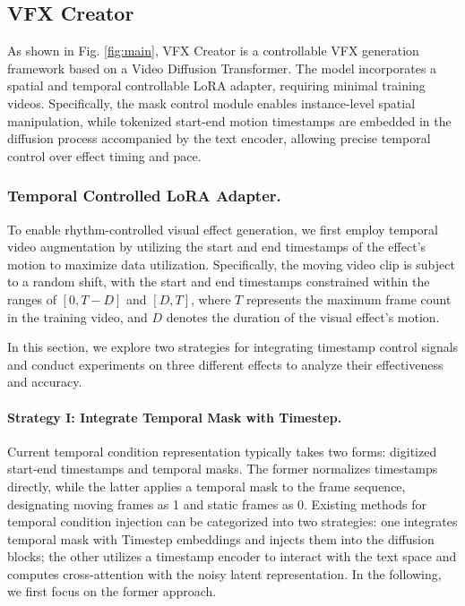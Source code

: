 \subsection{VFX Creator}
As shown in Fig. \ref{fig:main}, VFX Creator is a controllable VFX generation framework based on a Video Diffusion Transformer. The model incorporates a spatial and temporal controllable LoRA adapter, requiring minimal training videos. Specifically, the mask control module enables instance-level spatial manipulation, while tokenized start-end motion timestamps are embedded in the diffusion process accompanied by the text encoder, allowing precise temporal control over effect timing and pace.

\subsubsection{\textbf{Temporal Controlled LoRA Adapter.}}

To enable rhythm-controlled visual effect generation, we first employ temporal video augmentation by utilizing the start and end timestamps of the effect's motion to maximize data utilization. Specifically, the moving video clip is subject to a random shift, with the start and end timestamps constrained within the ranges of $[0, T-D]$ and $[D, T]$, where $T$ represents the maximum frame count in the training video, and $D$ denotes the duration of the visual effect's motion. 


In this section, we explore two strategies for integrating timestamp control signals and conduct experiments on three different effects to analyze their effectiveness and accuracy.
\paragraph{\textbf{Strategy I: Integrate Temporal Mask with Timestep.}}
Current temporal condition representation typically takes two forms: digitized start-end timestamps and temporal masks. The former normalizes timestamps directly, while the latter applies a temporal mask to the frame sequence, designating moving frames as 1 and static frames as 0. 
Existing methods for temporal condition injection can be categorized into two strategies: one integrates temporal mask with Timestep embeddings and injects them into the diffusion blocks; the other utilizes a timestamp encoder to interact with the text space and computes cross-attention with the noisy latent representation. In the following, we first focus on the former approach.

